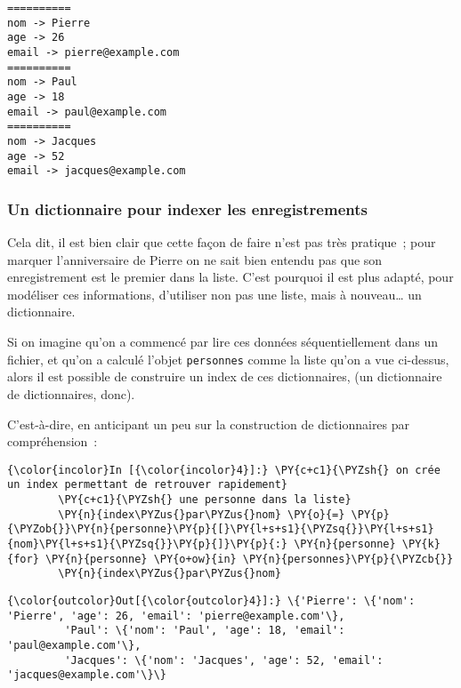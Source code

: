     \begin{Verbatim}[commandchars=\\\{\}]
==========
nom -> Pierre
age -> 26
email -> pierre@example.com
==========
nom -> Paul
age -> 18
email -> paul@example.com
==========
nom -> Jacques
age -> 52
email -> jacques@example.com

    \end{Verbatim}

    \hypertarget{un-dictionnaire-pour-indexer-les-enregistrements}{%
\subsubsection{Un dictionnaire pour indexer les
enregistrements}\label{un-dictionnaire-pour-indexer-les-enregistrements}}

    Cela dit, il est bien clair que cette façon de faire n'est pas très
pratique~; pour marquer l'anniversaire de Pierre on ne sait bien entendu
pas que son enregistrement est le premier dans la liste. C'est pourquoi
il est plus adapté, pour modéliser ces informations, d'utiliser non pas
une liste, mais à nouveau\ldots{} un dictionnaire.

Si on imagine qu'on a commencé par lire ces données séquentiellement
dans un fichier, et qu'on a calculé l'objet \texttt{personnes} comme la
liste qu'on a vue ci-dessus, alors il est possible de construire un
index de ces dictionnaires, (un dictionnaire de dictionnaires, donc).

C'est-à-dire, en anticipant un peu sur la construction de dictionnaires
par compréhension~:

    \begin{Verbatim}[commandchars=\\\{\}]
{\color{incolor}In [{\color{incolor}4}]:} \PY{c+c1}{\PYZsh{} on crée un index permettant de retrouver rapidement}
        \PY{c+c1}{\PYZsh{} une personne dans la liste}
        \PY{n}{index\PYZus{}par\PYZus{}nom} \PY{o}{=} \PY{p}{\PYZob{}}\PY{n}{personne}\PY{p}{[}\PY{l+s+s1}{\PYZsq{}}\PY{l+s+s1}{nom}\PY{l+s+s1}{\PYZsq{}}\PY{p}{]}\PY{p}{:} \PY{n}{personne} \PY{k}{for} \PY{n}{personne} \PY{o+ow}{in} \PY{n}{personnes}\PY{p}{\PYZcb{}}
        \PY{n}{index\PYZus{}par\PYZus{}nom}
\end{Verbatim}


\begin{Verbatim}[commandchars=\\\{\}]
{\color{outcolor}Out[{\color{outcolor}4}]:} \{'Pierre': \{'nom': 'Pierre', 'age': 26, 'email': 'pierre@example.com'\},
         'Paul': \{'nom': 'Paul', 'age': 18, 'email': 'paul@example.com'\},
         'Jacques': \{'nom': 'Jacques', 'age': 52, 'email': 'jacques@example.com'\}\}
\end{Verbatim}
            
